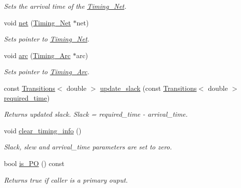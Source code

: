\begin{DoxyCompactItemize}
\begin{DoxyCompactList}\small\item\em Sets the arrival time of the \hyperlink{classTiming__Analysis_1_1Timing__Net}{Timing\-\_\-\-Net}. \end{DoxyCompactList}\item 
void \hyperlink{classTiming__Analysis_1_1Timing__Point_ab17571917e751e2d9bdd8dc11404bb66}{net} (\hyperlink{classTiming__Analysis_1_1Timing__Net}{Timing\-\_\-\-Net} $\ast$net)
\begin{DoxyCompactList}\small\item\em Sets pointer to \hyperlink{classTiming__Analysis_1_1Timing__Net}{Timing\-\_\-\-Net}. \end{DoxyCompactList}\item 
void \hyperlink{classTiming__Analysis_1_1Timing__Point_a7db0f9baed61c0534e19c2009ac41db5}{arc} (\hyperlink{classTiming__Analysis_1_1Timing__Arc}{Timing\-\_\-\-Arc} $\ast$arc)
\begin{DoxyCompactList}\small\item\em Sets pointer to \hyperlink{classTiming__Analysis_1_1Timing__Arc}{Timing\-\_\-\-Arc}. \end{DoxyCompactList}\item 
const \hyperlink{classTransitions}{Transitions}$<$ double $>$ \hyperlink{classTiming__Analysis_1_1Timing__Point_a62c2af027f267f45294b593f880bfe2d}{update\-\_\-slack} (const \hyperlink{classTransitions}{Transitions}$<$ double $>$ \hyperlink{classTiming__Analysis_1_1Timing__Point_aab60710f64cbc89f7316515aaca8ea17}{required\-\_\-time})
\begin{DoxyCompactList}\small\item\em Returns updated slack. Slack = required\-\_\-time -\/ arrival\-\_\-time. \end{DoxyCompactList}\item 
void \hyperlink{classTiming__Analysis_1_1Timing__Point_a737bfc39dc3271c9b605d1d16ba8816c}{clear\-\_\-timing\-\_\-info} ()
\begin{DoxyCompactList}\small\item\em Slack, slew and arrival\-\_\-time parameters are set to zero. \end{DoxyCompactList}\item 
bool \hyperlink{classTiming__Analysis_1_1Timing__Point_a2223c8ec07ef018d39db5c7e03df90a9}{is\-\_\-\-P\-O} () const 
\begin{DoxyCompactList}\small\item\em Returns true if caller is a primary ouput. \end{DoxyCompactList}\item 

\end{DoxyCompactItemize}
